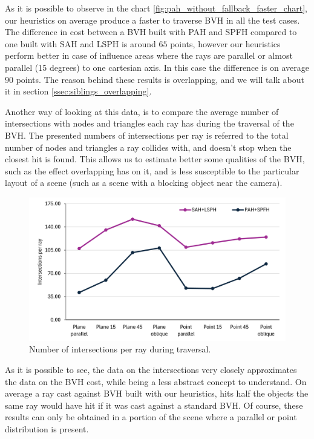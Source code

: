 \documentclass{PoliMi_MasterThesis}
\begin{document}
As it is possible to observe in the chart \ref{fig:pah_without_fallback_faster_chart}, our heuristics on average produce a faster to traverse BVH in all the test cases. The difference in cost between a BVH built with PAH and SPFH compared to one built with SAH and LSPH is around $65$ points, however our heuristics perform better in case of influence areas where the rays are parallel or almost parallel (15 degrees) to one cartesian axis. In this case the difference is on average $90$ points. The reason behind these results is overlapping, and we will talk about it in section \ref{ssec:siblings_overlapping}.

Another way of looking at this data, is to compare the average number of intersections with nodes and triangles each ray has during the traversal of the BVH. The presented numbers of intersections per ray is referred to the total number of nodes and triangles a ray collides with, and doesn't stop when the closest hit is found. This allows us to estimate better some qualities of the BVH, such as the effect overlapping has on it, and is less susceptible to the particular layout of a scene (such as a scene with a blocking object near the camera).

\begin{figure}[H] 
	\centering
	\includegraphics[width=\textwidth]{Images/pah_without_fallback_faster_intersections_chart.png}
	\caption{Number of intersections per ray during traversal.}
	\label{fig:pah_without_fallback_faster_intersections_chart}
\end{figure}

As it is possible to see, the data on the intersections very closely approximates the data on the BVH cost, while being a less abstract concept to understand. On average a ray cast against BVH built with our heuristics, hits half the objects the same ray would have hit if it was cast against a standard BVH. Of course, these results can only be obtained in a portion of the scene where a parallel or point distribution is present.
\end{document}
